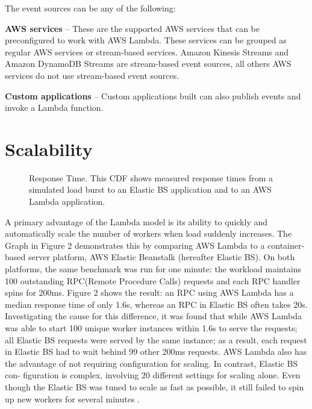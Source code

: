 \documentclass[9pt,twocolumn,twoside]{../../styles/osajnl}
\begin{document}
The event sources can be any of the following:

\textbf{AWS services} – These are the supported AWS services that can be 
preconfigured to work with AWS Lambda. These services can be grouped as regular 
AWS services or stream-based services. Amazon Kinesis Streams 
\cite{www-AWSKinesis} and Amazon DynamoDB Streams \cite{www-AWSDynamoStream} 
are stream-based event sources, all others AWS services do not use stream-based 
event sources. 
 
\textbf{Custom applications} – Custom applications built can also publish 
events and invoke a Lambda function.

\section{Scalability}


\begin{figure}[H]
\centering
\graphicspath{ {images/} }
\caption{Response Time. This CDF shows measured
response times from a simulated load burst to an Elastic BS
application and to an AWS Lambda application.}  \cite{OpenLambda}
\label{fig:false-color}
\end{figure}


A primary advantage of the Lambda model is its ability
to quickly and automatically scale the number of workers
when load suddenly increases. The Graph in Figure 2 demonstrates this by 
comparing AWS Lambda to a container-based server platform,
AWS Elastic Beanstalk \cite{www-AWSEBS} (hereafter Elastic BS).
On both platforms, the same benchmark was run for one
minute: the workload maintains 100 outstanding RPC(Remote Procedure Calls)
requests and each RPC handler spins for 200ms.
Figure 2 shows the result: an RPC using AWS Lambda
has a median response time of only 1.6s, whereas an RPC
in Elastic BS often takes 20s. Investigating the cause for
this difference, it was found that while AWS Lambda was
able to start 100 unique worker instances within 1.6s to
serve the requests; all Elastic BS requests were served by
the same instance; as a result, each request in Elastic BS
had to wait behind 99 other 200ms requests.
AWS Lambda also has the advantage of not requiring
configuration for scaling. In contrast, Elastic BS con-
figuration is complex, involving 20 different settings for
scaling alone. Even though the Elastic BS was tuned to scale
as fast as possible, it still
failed to spin up new workers for several minutes  \cite{OpenLambda}.
\end{document}
